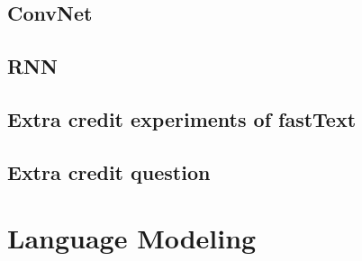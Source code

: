 \documentclass[a4paper]{article}
\begin{document}
\subsection{ConvNet}

\subsection{RNN}

\subsection{Extra credit experiments of fastText}

\subsection{Extra credit question}

\section{Language Modeling}
\end{document}
